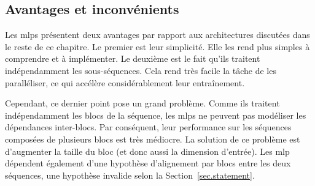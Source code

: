 \subsection{Avantages et inconvénients}

Les \glspl{mlp} présentent deux avantages par rapport aux architectures discutées dans le reste de ce chapitre.
Le premier est leur simplicité. 
Elle les rend plus simples à comprendre et à implémenter.
Le deuxième est le fait qu'ils traitent indépendamment les sous-séquences.
Cela rend très facile la tâche de les paralléliser,
ce qui accélère considérablement leur entraînement.

Cependant, ce dernier point pose un grand problème.
Comme ils traitent indépendamment les blocs de la séquence, 
les \glspl{mlp} ne peuvent pas modéliser les dépendances inter-blocs.
Par conséquent, leur performance sur les séquences composées de plusieurs blocs est très médiocre.
La solution de ce problème est d'augmenter la taille du bloc (et donc aussi la dimension d'entrée).
Les \gls{mlp} dépendent également d'une hypothèse d'alignement par blocs entre les deux séquences,
une hypothèse invalide selon la Section~\ref{sec.statement}.